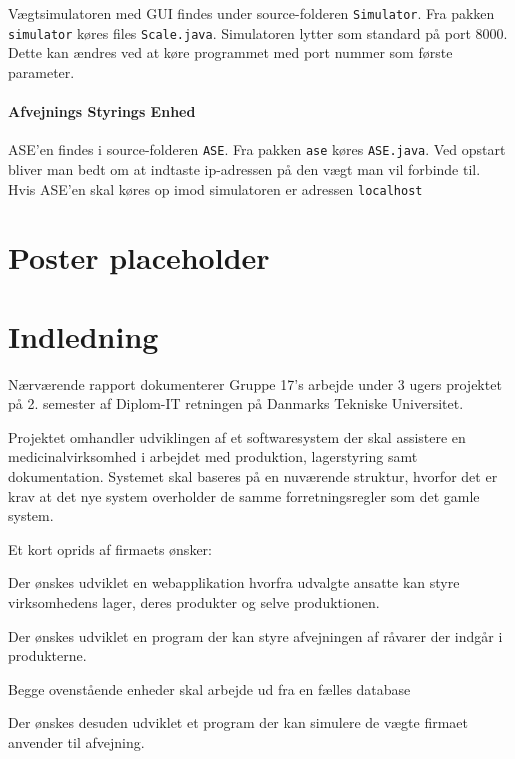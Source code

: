 \documentclass[a4paper]{article}
\newenvironment{my_itemize}
{\begin{itemize}
  \setlength{\itemsep}{1pt}
  \setlength{\parskip}{0pt}
  \setlength{\parsep}{0pt}}
{\end{itemize}}
\begin{document}
Vægtsimulatoren med GUI findes under source-folderen \texttt{Simulator}. Fra pakken \texttt{simulator} køres files \texttt{Scale.java}. Simulatoren lytter som standard på port 8000. Dette kan ændres ved at køre programmet med port nummer som første parameter.


\paragraph{Afvejnings Styrings Enhed} %

ASE'en findes i source-folderen \texttt{ASE}. Fra pakken \texttt{ase} køres \texttt{ASE.java}. Ved opstart bliver man bedt om at indtaste ip-adressen på den vægt man vil forbinde til. Hvis ASE'en skal køres op imod simulatoren er adressen \texttt{localhost}



\clearpage

\section*{Poster placeholder} %

\clearpage

\tableofcontents
\clearpage

\section{Indledning} %

Nærværende rapport dokumenterer Gruppe 17's arbejde under 3 ugers projektet på 2. semester af Diplom-IT retningen på Danmarks Tekniske Universitet.

Projektet omhandler udviklingen af et softwaresystem der skal assistere en medicinalvirksomhed i arbejdet med produktion, lagerstyring samt dokumentation. Systemet skal baseres på en nuværende struktur, hvorfor det er krav at det nye system overholder de samme forretningsregler som det gamle system.

Et kort oprids af firmaets ønsker:
\begin{my_itemize}
  \item Der ønskes udviklet en webapplikation hvorfra udvalgte ansatte kan styre virksomhedens lager, deres produkter og selve produktionen.
  \item Der ønskes udviklet en program der kan styre afvejningen af råvarer der indgår i produkterne.
  \item Begge ovenstående enheder skal arbejde ud fra en fælles database
\end{my_itemize}
Der ønskes desuden udviklet et program der kan simulere de vægte firmaet anvender til afvejning.
\end{document}
